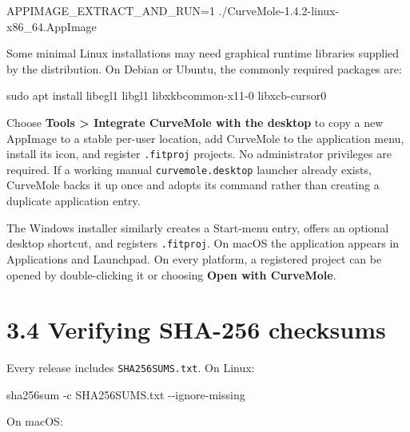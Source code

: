 \documentclass[
  10pt,
  a4paper,
  oneside]{scrreprt}
\newenvironment{Shaded}{}{}
\newcommand{\ExtensionTok}[1]{#1}
\newcommand{\FunctionTok}[1]{\textcolor[rgb]{0.02,0.16,0.49}{#1}}
\newcommand{\NormalTok}[1]{#1}
\newcommand{\VariableTok}[1]{\textcolor[rgb]{0.10,0.09,0.49}{#1}}
\begin{document}
\begin{Shaded}
\begin{Highlighting}[]
\VariableTok{APPIMAGE\_EXTRACT\_AND\_RUN=}\NormalTok{1 }\ExtensionTok{./CurveMole{-}1.4.2{-}linux{-}x86\_64.AppImage}
\end{Highlighting}
\end{Shaded}

Some minimal Linux installations may need graphical runtime libraries
supplied by the distribution. On Debian or Ubuntu, the commonly required
packages are:

\begin{Shaded}
\begin{Highlighting}[]
\FunctionTok{sudo}\NormalTok{ apt install libegl1 libgl1 libxkbcommon{-}x11{-}0 libxcb{-}cursor0}
\end{Highlighting}
\end{Shaded}

Choose \textbf{Tools \textgreater{} Integrate CurveMole with the
desktop} to copy a new AppImage to a stable per-user location, add
CurveMole to the application menu, install its icon, and register
\texttt{.fitproj} projects. No administrator privileges are required. If
a working manual \texttt{curvemole.desktop} launcher already exists,
CurveMole backs it up once and adopts its command rather than creating a
duplicate application entry.

The Windows installer similarly creates a Start-menu entry, offers an
optional desktop shortcut, and registers \texttt{.fitproj}. On macOS the
application appears in Applications and Launchpad. On every platform, a
registered project can be opened by double-clicking it or choosing
\textbf{Open with CurveMole}.

\hypertarget{verifying-sha-256-checksums}{%
\section{3.4 Verifying SHA-256
checksums}\label{verifying-sha-256-checksums}}

Every release includes \texttt{SHA256SUMS.txt}. On Linux:

\begin{Shaded}
\begin{Highlighting}[]
\ExtensionTok{sha256sum}\NormalTok{ {-}c SHA256SUMS.txt {-}{-}ignore{-}missing}
\end{Highlighting}
\end{Shaded}

On macOS:
\end{document}
